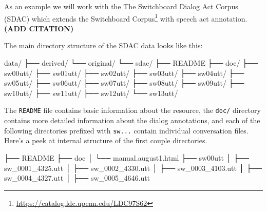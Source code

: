 \documentclass[
  letterpaper,
  DIV=11,
  numbers=noendperiod]{scrreport}
\newenvironment{Shaded}{\begin{snugshade}}{\end{snugshade}}
\newcommand{\ExtensionTok}[1]{\textcolor[rgb]{0.00,0.00,0.00}{#1}}
\newcommand{\NormalTok}[1]{\textcolor[rgb]{0.00,0.00,0.00}{#1}}
\theoremstyle{definition}
\theoremstyle{remark}
\DeclareRobustCommand{\href}[2]{#2\footnote{\url{#1}}}
\begin{document}
As an example we will work with the The Switchboard Dialog Act Corpus
(SDAC) which extends the
\href{https://catalog.ldc.upenn.edu/LDC97S62}{Switchboard Corpus} with
speech act annotation. \textbf{(ADD CITATION)}

The main directory structure of the SDAC data looks like this:

\begin{Shaded}
\begin{Highlighting}[]
\ExtensionTok{data/}
\ExtensionTok{├──}\NormalTok{ derived/}
\ExtensionTok{└──}\NormalTok{ original/}
    \ExtensionTok{└──}\NormalTok{ sdac/}
        \ExtensionTok{├──}\NormalTok{ README}
        \ExtensionTok{├──}\NormalTok{ doc/}
        \ExtensionTok{├──}\NormalTok{ sw00utt/}
        \ExtensionTok{├──}\NormalTok{ sw01utt/}
        \ExtensionTok{├──}\NormalTok{ sw02utt/}
        \ExtensionTok{├──}\NormalTok{ sw03utt/}
        \ExtensionTok{├──}\NormalTok{ sw04utt/}
        \ExtensionTok{├──}\NormalTok{ sw05utt/}
        \ExtensionTok{├──}\NormalTok{ sw06utt/}
        \ExtensionTok{├──}\NormalTok{ sw07utt/}
        \ExtensionTok{├──}\NormalTok{ sw08utt/}
        \ExtensionTok{├──}\NormalTok{ sw09utt/}
        \ExtensionTok{├──}\NormalTok{ sw10utt/}
        \ExtensionTok{├──}\NormalTok{ sw11utt/}
        \ExtensionTok{├──}\NormalTok{ sw12utt/}
        \ExtensionTok{└──}\NormalTok{ sw13utt/}
\end{Highlighting}
\end{Shaded}

The \texttt{README} file contains basic information about the resource,
the \texttt{doc/} directory contains more detailed information about the
dialog annotations, and each of the following directories prefixed with
\texttt{sw...} contain individual conversation files. Here's a peek at
internal structure of the first couple directories.

\begin{Shaded}
\begin{Highlighting}[]
\ExtensionTok{├──}\NormalTok{ README}
\ExtensionTok{├──}\NormalTok{ doc}
\ExtensionTok{│}\NormalTok{   └── manual.august1.html}
\ExtensionTok{├──}\NormalTok{ sw00utt}
\ExtensionTok{│}\NormalTok{   ├── sw\_0001\_4325.utt}
\ExtensionTok{│}\NormalTok{   ├── sw\_0002\_4330.utt}
\ExtensionTok{│}\NormalTok{   ├── sw\_0003\_4103.utt}
\ExtensionTok{│}\NormalTok{   ├── sw\_0004\_4327.utt}
\ExtensionTok{│}\NormalTok{   ├── sw\_0005\_4646.utt}
\end{Highlighting}
\end{Shaded}
\end{document}
